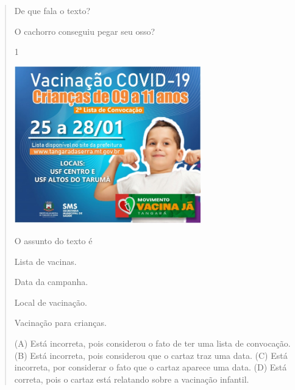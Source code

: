 \begin{verse}

\begin{escolha}
\item De que fala o texto?


\item O cachorro conseguiu pegar seu osso?

\end{escolha}


\num{1}

\includegraphics[width=3.17910in,height=2.68418in]{media/image124.jpeg}


O assunto do texto é

\begin{escolha}
\item Lista de vacinas.

\item Data da campanha.

\item Local de vacinação.

\item Vacinação para crianças.
\end{escolha}


(A) Está incorreta, pois considerou o fato de ter uma lista de convocação.
(B) Está incorreta, pois considerou que o cartaz traz uma data.
(C) Está incorreta, por considerar o fato que o cartaz aparece uma data.
(D) Está correta, pois o cartaz está relatando sobre a vacinação infantil.


\end{verse}
